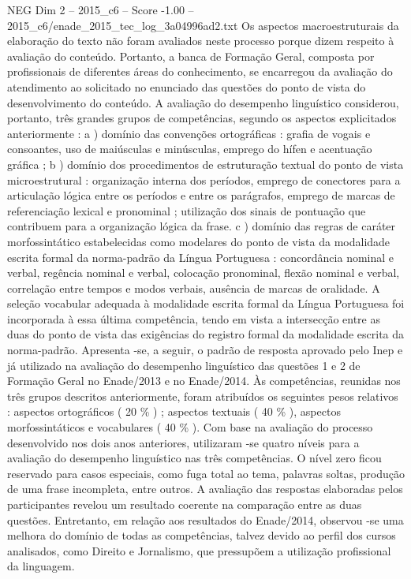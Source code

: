 \begin{textsample}{NEG Dim 2 – 2015\_c6 – Score -1.00 – 2015\_c6/enade\_2015\_tec\_log\_3a04996ad2.txt}
Os aspectos macroestruturais da elaboração do texto não foram avaliados neste processo porque dizem respeito à avaliação do conteúdo.
Portanto, a banca de Formação Geral, composta por profissionais de diferentes áreas do conhecimento, se encarregou da avaliação do atendimento ao solicitado no enunciado das questões do ponto de vista do desenvolvimento do conteúdo.
A avaliação do desempenho linguístico considerou, portanto, três grandes grupos de competências, segundo os aspectos explicitados anteriormente : a ) domínio das convenções ortográficas : grafia de vogais e consoantes, uso de maiúsculas e minúsculas, emprego do hífen e acentuação gráfica ; b ) domínio dos procedimentos de estruturação textual do ponto de vista microestrutural : organização interna dos períodos, emprego de conectores para a articulação lógica entre os períodos e entre os parágrafos, emprego de marcas de referenciação lexical e pronominal ; utilização dos sinais de pontuação que contribuem para a organização lógica da frase. c ) domínio das regras de caráter morfossintático estabelecidas como modelares do ponto de vista da modalidade escrita formal da norma-padrão da Língua Portuguesa : concordância nominal e verbal, regência nominal e verbal, colocação pronominal, flexão nominal e verbal, correlação entre tempos e modos verbais, ausência de marcas de oralidade.
A seleção vocabular adequada à modalidade escrita formal da Língua Portuguesa foi incorporada à essa última competência, tendo em vista a intersecção entre as duas do ponto de vista das exigências do registro formal da modalidade escrita da norma-padrão.
Apresenta -se, a seguir, o padrão de resposta aprovado pelo Inep e já utilizado na avaliação do desempenho linguístico das questões 1 e 2 de Formação Geral no Enade/2013 e no Enade/2014.
Às competências, reunidas nos três grupos descritos anteriormente, foram atribuídos os seguintes pesos relativos : aspectos ortográficos ( 20 \% ) ; aspectos textuais ( 40 \% ), aspectos morfossintáticos e vocabulares ( 40 \% ).
Com base na avaliação do processo desenvolvido nos dois anos anteriores, utilizaram -se quatro níveis para a avaliação do desempenho linguístico nas três competências.
O nível zero ficou reservado para casos especiais, como fuga total ao tema, palavras soltas, produção de uma frase incompleta, entre outros.
A avaliação das respostas elaboradas pelos participantes revelou um resultado coerente na comparação entre as duas questões.
Entretanto, em relação aos resultados do Enade/2014, observou -se uma melhora do domínio de todas as competências, talvez devido ao perfil dos cursos analisados, como Direito e Jornalismo, que pressupõem a utilização profissional da linguagem.

\end{textsample}
